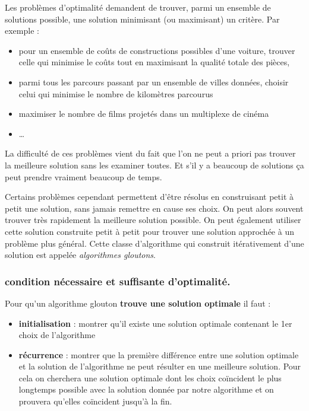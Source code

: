 \documentclass[
]{article}
\providecommand{\tightlist}{%
  \setlength{\itemsep}{0pt}\setlength{\parskip}{0pt}}
\begin{document}
Les problèmes d'optimalité demandent de trouver, parmi un ensemble de
solutions possible, une solution minimisant (ou maximisant) un critère.
Par exemple :

\begin{itemize}
\tightlist
\item
  pour un ensemble de coûts de constructions possibles d'une voiture,
  trouver celle qui minimise le coûts tout en maximisant la qualité
  totale des pièces,
\item
  parmi tous les parcours passant par un ensemble de villes données,
  choisir celui qui minimise le nombre de kilomètres parcourus
\item
  maximiser le nombre de films projetés dans un multiplexe de cinéma
\item
  \ldots{}
\end{itemize}

La difficulté de ces problèmes vient du fait que l'on ne peut a priori
pas trouver la meilleure solution sans les examiner toutes. Et s'il y a
beaucoup de solutions ça peut prendre vraiment beaucoup de temps.

Certains problèmes cependant permettent d'être résolus en construisant
petit à petit une solution, sans jamais remettre en cause ses choix. On
peut alors souvent trouver très rapidement la meilleure solution
possible. On peut également utiliser cette solution construite petit à
petit pour trouver une solution approchée à un problème plus général.
Cette classe d'algorithme qui construit itérativement d'une solution est
appelée \emph{algorithmes gloutons}.

\hypertarget{condition-nuxe9cessaire-et-suffisante-doptimalituxe9.}{%
\subsubsection{condition nécessaire et suffisante
d'optimalité.}\label{condition-nuxe9cessaire-et-suffisante-doptimalituxe9.}}

Pour qu'un algorithme glouton \textbf{trouve une solution optimale} il
faut :

\begin{itemize}
\tightlist
\item
  \textbf{initialisation} : montrer qu'il existe une solution optimale
  contenant le 1er choix de l'algorithme
\item
  \textbf{récurrence} : montrer que la première différence entre une
  solution optimale et la solution de l'algorithme ne peut résulter en
  une meilleure solution. Pour cela on cherchera une solution optimale
  dont les choix coïncident le plus longtemps possible avec la solution
  donnée par notre algorithme et on prouvera qu'elles coïncident jusqu'à
  la fin.
\end{itemize}
\end{document}
